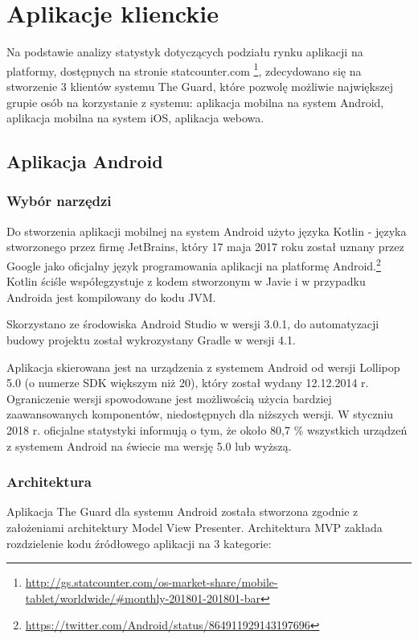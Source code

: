 \chapter{Aplikacje klienckie}

Na podstawie analizy statystyk dotyczących podziału rynku aplikacji na platformy, dostępnych na stronie statcounter.com \footnote{\url{http://gs.statcounter.com/os-market-share/mobile-tablet/worldwide/#monthly-201801-201801-bar}}, zdecydowano się na stworzenie 3 klientów systemu The Guard, które pozwolę możliwie największej grupie osób na korzystanie z systemu:
\newline
\newline
\textbullet \space aplikacja mobilna na system Android,\newline
\textbullet \space aplikacja mobilna na system iOS,\newline
\textbullet \space aplikacja webowa.

\section{Aplikacja Android}
\subsection*{Wybór narzędzi}
Do stworzenia aplikacji mobilnej na system Android użyto języka Kotlin - języka stworzonego przez firmę JetBrains, który 17 maja 2017 roku został uznany przez Google jako oficjalny język programowania aplikacji na platformę Android.\footnote{\url{https://twitter.com/Android/status/864911929143197696}}
Kotlin ściśle współegzystuje z kodem stworzonym w Javie i w przypadku Androida jest kompilowany do kodu JVM.

Skorzystano ze środowiska Android Studio w wersji 3.0.1, do automatyzacji budowy projektu został wykrozystany Gradle w wersji 4.1.

Aplikacja skierowana jest na urządzenia z systemem Android od wersji Lollipop 5.0 (o numerze SDK większym niż 20), który został wydany 12.12.2014 r. Ograniczenie wersji spowodowane jest możliwością użycia bardziej zaawansowanych komponentów, niedostępnych dla niższych wersji. W styczniu 2018 r. oficjalne statystyki informują o tym, że około 80,7 \% wszystkich urządzeń z systemem Android na świecie ma wersję 5.0 lub wyższą.

\subsection*{Architektura}
Aplikacja The Guard dla systemu Android została stworzona zgodnie z założeniami architektury Model View Presenter. Architektura MVP zakłada rozdzielenie kodu źródłowego aplikacji na 3 kategorie:

